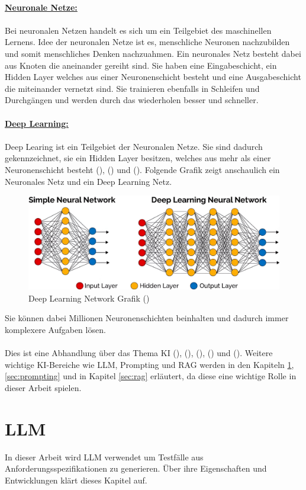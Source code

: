 \documentclass[12pt,toc=bib,toc=listof]{scrreprt}
\begin{document}
\\
\textbf{\underline{Neuronale Netze:}}\\
\\
Bei neuronalen Netzen handelt es sich um ein Teilgebiet des maschinellen Lernens. Idee der neuronalen Netze ist es, menschliche Neuronen nachzubilden und somit menschliches Denken nachzuahmen. Ein neuronales Netz besteht dabei aus Knoten die aneinander gereiht sind. Sie haben eine Eingabeschicht, ein Hidden Layer welches aus einer Neuronenschicht besteht und eine Ausgabeschicht die miteinander vernetzt sind. Sie trainieren ebenfalls in Schleifen und Durchgängen und werden durch das wiederholen besser und schneller.\\
\\
\textbf{\underline{Deep Learning:}}\\
\\
Deep Learing ist ein Teilgebiet der Neuronalen Netze. Sie sind dadurch gekennzeichnet, sie ein Hidden Layer besitzen, welches aus mehr als einer Neuronenschicht besteht (\cite{Bhatt2021}), (\cite{Dymatrix2018}) und (\cite{Zhu2021}). Folgende Grafik zeigt anschaulich ein Neuronales Netz und ein Deep Learning Netz.
\begin{figure} [H]
    \centering
    \includegraphics[width=0.75\linewidth]{./Bilder/Dymatrix_Deep_Learning_Networks.jpeg}
    \caption{Deep Learning Network Grafik (\cite{Dymatrix2018})}
    \label{fig:enter-label}
\end{figure}
\noindent Sie können dabei Millionen Neuronenschichten beinhalten und dadurch immer komplexere Aufgaben lösen.\\
\\
Dies ist eine Abhandlung über das Thema KI (\cite{Bhatt2021}), (\cite{Hecker2018}), (\cite{Mocko2021}), (\cite{Roscher2025}) und (\cite{Zhu2021}). Weitere wichtige KI-Bereiche wie LLM, Prompting und RAG werden in den Kapiteln \ref{sec:llm}, \ref{sec:prompting} und in Kapitel \ref{sec:rag} erläutert, da diese eine wichtige Rolle in dieser Arbeit spielen.

\section{LLM} %
\label{sec:llm}
In dieser Arbeit wird LLM verwendet um Testfälle aus Anforderungsspezifikationen zu generieren. Über ihre Eigenschaften und Entwicklungen klärt dieses Kapitel auf.
\end{document}
